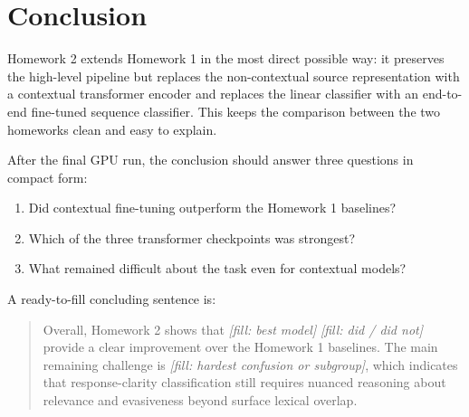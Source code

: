 \documentclass[12pt]{fphw}
\newcommand{\placeholder}[1]{\textit{[fill: #1]}}
\begin{document}
\section{Conclusion}

Homework 2 extends Homework 1 in the most direct possible way: it preserves the high-level pipeline but replaces the non-contextual source representation with a contextual transformer encoder and replaces the linear classifier with an end-to-end fine-tuned sequence classifier. This keeps the comparison between the two homeworks clean and easy to explain.

After the final GPU run, the conclusion should answer three questions in compact form:
\begin{enumerate}
	\item Did contextual fine-tuning outperform the Homework 1 baselines?
	\item Which of the three transformer checkpoints was strongest?
	\item What remained difficult about the task even for contextual models?
\end{enumerate}

A ready-to-fill concluding sentence is:

\begin{quote}
Overall, Homework 2 shows that \placeholder{best model} \placeholder{did / did not} provide a clear improvement over the Homework 1 baselines. The main remaining challenge is \placeholder{hardest confusion or subgroup}, which indicates that response-clarity classification still requires nuanced reasoning about relevance and evasiveness beyond surface lexical overlap.
\end{quote}



\end{document}
